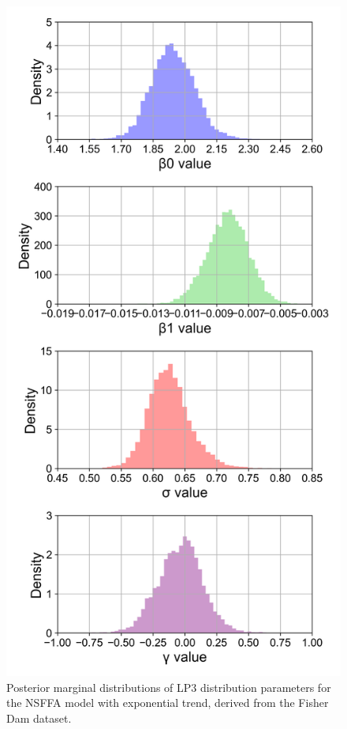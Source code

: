 \newpage
\begin{figure}[H]
    \centering
    \includegraphics[width=1\linewidth]{_plots/OCD_exponential_mu_posterior_marginal_lp3.png}
    \caption{Posterior marginal distributions of LP3 distribution parameters for the NSFFA model with exponential trend, derived from the Fisher Dam dataset.}
    \label{fig:OCD_exponential_mu_posterior_marginal_lp3}
\end{figure}

